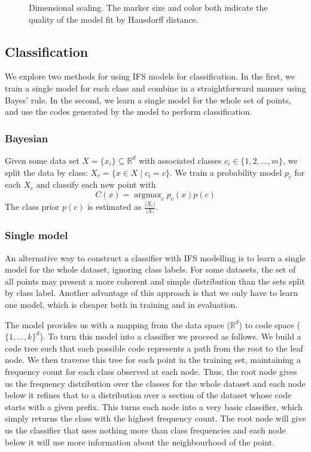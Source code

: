 \documentclass[10pt,a4paper,oneside]{article}
\theoremstyle{definition}
\DeclareMathOperator*{\argmax}{argmax}
\begin{document}
\begin{figure}[htb]
\begin{subfigure}[b]{0.33\textwidth}
\begin{tabular}{c c }
	\end{tabular}
  \end{subfigure}
  \caption{Dimensional scaling. The marker size and color both indicate the quality of the model fit by Hausdorff distance. }
  \label{fig:dim_scale}
\end{figure}


\subsection*{Classification}

We explore two methods for using IFS models for classification. In the first, we train a single model for each class and combine in a straightforward manner using Bayes' rule. In the second, we learn a single model for the whole set of points, and use the codes generated by the model to perform classification.  

\subsubsection*{Bayesian}

Given some data set $X = \{x_i\} \subseteq {\mathbb R}^d$ with associated classes $c_i \in \{1, 2, \ldots, m\}$, we split the data by class: $X_c = \{ x \in X \mid c_i = c\}$. We train a probability model $p_c$ for each $X_c$ and classify each new point with
\[
C(x) = \argmax_{c} p_c(x) p(c)
\]
The class prior $p(c)$ is estimated as $\frac{|X_c|}{|X|}$.

\subsubsection*{Single model}

An alternative way to construct a classifier with IFS modelling is to learn a single model for the whole dataset, ignoring class labels. For some datasets, the set of all points may present a more coherent and simple distribution than the sets split by class label. Another advantage of this approach is that we only have to learn one model, which is cheaper both in training and in evaluation.

The model provides us with a mapping from the data space (${\mathbb R}^d$) to code space ($\{1, \ldots, k\}^d$). To turn this model into a classifier we proceed as follows. We build a code tree such that each possible code represents a path from the root to the leaf node. We then traverse this tree for each point in the training set, maintaining a frequency count for each class observed at each node. Thus, the root node gives us the frequency distribution over the classes for the whole dataset and each node below it refines that to a distribution over a section of the dataset whose code starts with a given prefix. This turns each node into a very basic classifier, which simply returns the class with the highest frequency count. The root node will give us the classifier that uses nothing more than class frequencies and each node below it will use more information about the neighbourhood of the point.
\end{document}

